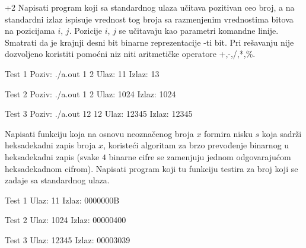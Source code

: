 \begin{Exercise}[label=209]\marker+{2}
Napisati program koji sa standardnog ulaza učitava pozitivan
  ceo broj, a na standardni izlaz ispisuje vrednost tog broja sa
  razmenjenim vrednostima bitova na pozicijama $i$,
  $j$. Pozicije $i$, $j$ se učitavaju kao parametri
  komandne linije. Smatrati da je krajnji desni bit binarne
  reprezentacije -ti bit. Pri rešavanju nije dozvoljeno koristiti
  pomoćni niz niti aritmetičke operatore +,-,/,*,\%.

\begin{minitest}
\begin{test}{Test 1}
Poziv:  ./a.out 1 2 
Ulaz:   11             
Izlaz:  13            
\end{test}
\end{minitest}
\begin{minitest}
\begin{test}{Test 2}
Poziv: ./a.out 1 2
Ulaz:   1024     
Izlaz:  1024        
\end{test}
\end{minitest}
\begin{minitest}
\begin{test}{Test 3}
Poziv: ./a.out 12 12
Ulaz:   12345
Izlaz:  12345
\end{test}
\end{minitest}
\end{Exercise}
\begin{Answer}[ref=209]
\end{Answer}

\begin{Exercise}[label=210]
  Napisati funkciju koja na osnovu neoznačenog broja $x$
  formira nisku $s$ koja sadrži heksadekadni zapis broja
  $x$, koristeći algoritam za brzo prevođenje binarnog u
  heksadekadni zapis (svake $4$ binarne cifre se zamenjuju jednom
  odgovarajućom heksadekadnom cifrom).  Napisati program koji tu
  funkciju testira za broj koji se zadaje sa standardnog ulaza.

\begin{minitest}
\begin{test}{Test 1}
Ulaz:   11             
Izlaz:  0000000B      
\end{test}
\end{minitest}
\begin{minitest}
\begin{test}{Test 2}
Ulaz:  1024        
Izlaz: 00000400  
\end{test}
\end{minitest}
\begin{minitest}
\begin{test}{Test 3}
Ulaz:  12345
Izlaz: 00003039
\end{test}
\end{minitest}

\end{Exercise}
\begin{Answer}[ref=210]
\end{Answer}

